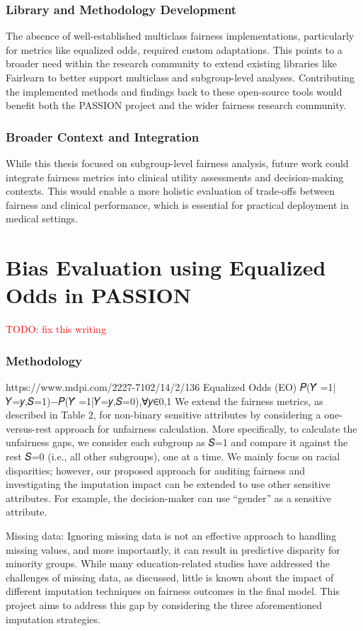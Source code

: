 \documentclass[12pt, a4paper, oneside]{book}   	%
\renewcommand{\todo}[1]{\textcolor{red}{TODO: #1}}
\newcommand{\rawcitationusedstart}{\color{violet}}
\begin{document}
	\subsection{Library and Methodology Development}
	
	The absence of well-established multiclass fairness implementations, particularly for metrics like equalized odds, required custom adaptations. This points to a broader need within the research community to extend existing libraries like Fairlearn to better support multiclass and subgroup-level analyses. Contributing the implemented methods and findings back to these open-source tools would benefit both the PASSION project and the wider fairness research community.
	
	\subsection{Broader Context and Integration}
	
	While this thesis focused on subgroup-level fairness analysis, future work could integrate fairness metrics into clinical utility assessments and decision-making contexts. This would enable a more holistic evaluation of trade-offs between fairness and clinical performance, which is essential for practical deployment in medical settings.
	
	
	\chapter{Bias Evaluation using Equalized Odds in PASSION}
		\todo{fix this writing}
		\subsection{Methodology}
		\rawcitationusedstart
		https://www.mdpi.com/2227-7102/14/2/136
		Equalized Odds (EO)	 𝑃(𝑌̂ =1|𝑌=𝑦,𝑆=1)−𝑃(𝑌̂ =1|𝑌=𝑦,𝑆=0),∀𝑦∈{0,1}
		We extend the fairness metrics, as described in Table 2, for non-binary sensitive attributes by considering a one-versus-rest approach for unfairness calculation. More specifically, to calculate the unfairness gaps, we consider each subgroup as 𝑆=1
		and compare it against the rest 𝑆=0
		(i.e., all other subgroups), one at a time. We mainly focus on racial disparities; however, our proposed approach for auditing fairness and investigating the imputation impact can be extended to use other sensitive attributes. For example, the decision-maker can use “gender” as a sensitive attribute.
		
		Missing data: Ignoring missing data is not an effective approach to handling missing values, and more importantly, it can result in predictive disparity for minority groups. While many education-related studies have addressed the challenges of missing data, as discussed, little is known about the impact of different imputation techniques on fairness outcomes in the final model. This project aims to address this gap by considering the three aforementioned imputation strategies.
		
\end{document}
